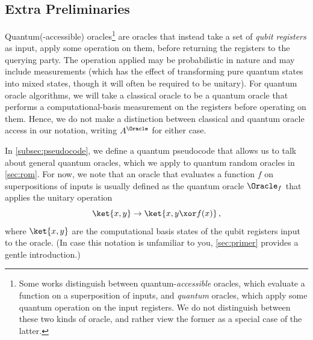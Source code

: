 \section{\titleQrom}\label{sec:qrom}
  \subsection{Extra Preliminaries}
    Quantum(-accessible) oracles\footnote{
      Some works distinguish between quantum-\emph{accessible} oracles,
      which evaluate a function on a superposition of inputs, and
      \emph{quantum} oracles, which apply some quantum operation on the input
      registers.
      We do not distinguish between these two kinds of oracle, and rather view
      the former as a special case of the latter.
      } are oracles that instead take a set of \emph{qubit registers} as input,
      apply some operation on them, before returning the registers to the
      querying party. The operation applied may be probabilistic in nature and
      may include measurements (which has the effect of transforming pure
      quantum states into mixed states, though it will often be required to be
      unitary).
      For quantum oracle algorithms, we will take a classical oracle to be a
      quantum oracle that performs a computational-basis measurement on the
      registers before operating on them. Hence, we do not make a
      distinction between classical and quantum oracle access 
      in our notation, writing $A^\Oracle$ for either case. 

    In \cref{subsec:pseudocode}, we define a quantum pseudocode that allows
      us to talk about general quantum oracles, which we apply to quantum random
      oracles in \cref{sec:rom}. For now, we note that an oracle that
      evaluates a function $f$ on superpositions of inputs is
      usually defined as the quantum oracle $\Oracle_f$ that applies the
      unitary operation
      \[
        \ket{x,y} \to \ket{x,y \xor f(x)}\, ,
      \]
      where $\ket{x,y}$ are the computational basis states of the qubit
      registers input to the oracle. (In case this notation is
      unfamiliar to you, \cref{sec:primer} provides a gentle introduction.)
